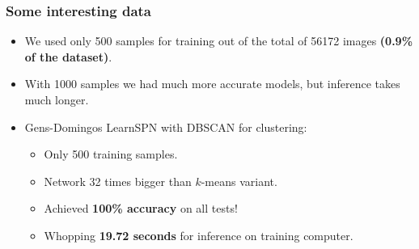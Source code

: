 \documentclass{beamer}
\begin{document}
\begin{frame}
  \frametitle{Some interesting data}

  \begin{itemize}
    \item We used only 500 samples for training out of the total of 56172 images \textbf{(0.9\% of
      the dataset)}.
    \item With 1000 samples we had much more accurate models, but inference takes much longer.
    \item Gens-Domingos LearnSPN with DBSCAN for clustering:\\
      \begin{itemize}
        \item Only 500 training samples.
        \item Network 32 times bigger than $k$-means variant.
        \item Achieved \textbf{100\% accuracy} on all tests!
        \item Whopping \textbf{19.72 seconds} for inference on training computer.
      \end{itemize}
  \end{itemize}

\end{frame}
\end{document}
